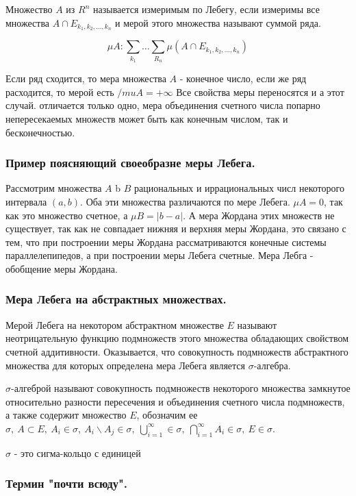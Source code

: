 \documentclass[14pt,a4paper]{extarticle}
\theoremstyle{definition}
\theoremstyle{remark}
\newcommand{\sep}{ , \ \allowbreak }
\renewcommand{\[}{\begin{dmath*}[compact]}
\renewcommand{\]}{\end{dmath*}}
\newcommand{\sigmalgebra}{\sigma}
\begin{document}
Множество $A$ из $R^n$ называется измеримым по Лебегу, если измеримы все множества $A \cap E_{k_1,k_2,\dots,k_n}$ и мерой этого множества называют суммой ряда.

\[\mu A: \sum_{k_1} \dots \sum_{R_n} \mu (A \cap E_{k_1,k_2,\dots,k_n})\]

Если ряд сходится, то мера множества $A$ - конечное число, если же ряд расходится, то мерой есть $/mu A = + \infty$ Все свойства меры переносятся и а этот случай. отличается только одно, мера объединения счетного числа попарно непересекаемых множеств может быть как конечным числом, так и бесконечностью.

\subsubsection{Пример поясняющий своеобразне меры Лебега.}

Рассмотрим множества $A$ b $B$ рациональных и иррациональных числ некоторого интервала $(a,b)$. Оба эти множества различаются по мере Лебега. $\mu A = 0$, так как это множество счетное, а $\mu B = |b-a|$. А мера Жордана этих множеств не существует, так как не совпадает нижняя и верхняя меры Жордана, это связано с тем, что при построении меры Жордана рассматриваются конечные системы параллелепипедов, а при построении меры Лебега счетные. Мера Лебга - обобщение меры Жордана.

\subsubsection{Мера Лебега на абстрактных множествах.}

Мерой Лебега на некотором абстрактном множестве $E$ называют неотрицательную функцию подмножеств этого множества обладающих свойством счетной аддитивности. Оказывается, что совокупность подмножеств абстрактного множества для которых определена мера Лебега является $\sigma$-алгебра.

$\sigma$-алгеброй называют совокупность подмножеств некоторого множества
замкнутое относительно разности пересечения и объединения счетного числа
подмножеств, а также содержит множество $E$, обозначим ее
$ \sigmalgebra \sep A \subset E \sep A_i \in \sigmalgebra \sep
{A_i \backslash A_j \in \sigmalgebra} \sep
\bigcup _ {i=1}^\infty \in \sigmalgebra \sep
\bigcap _ {i=1}^\infty A_i \in \sigmalgebra \sep {E \in \sigmalgebra}$.

$\sigmalgebra$ - это сигма-кольцо с единицей

\subsubsection{Термин "почти всюду".}
\end{document}
